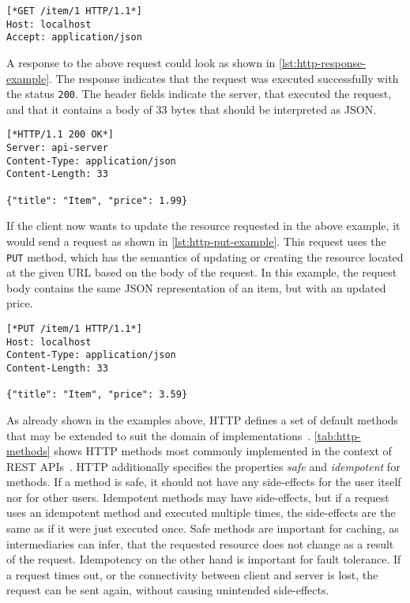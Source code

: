 \begin{lstlisting}[caption={\acs{HTTP} GET request}, showlines=true, label=lst:http-get-example, language=http]
[*GET /item/1 HTTP/1.1*]
Host: localhost
Accept: application/json

\end{lstlisting}

A response to the above request could look as shown in \autoref{lst:http-response-example}.
The response indicates that the request was executed successfully with the status \texttt{200}.
The header fields indicate the server, that executed the request, and that it contains a body of 33 bytes that should be interpreted as \ac{JSON}.

\begin{lstlisting}[caption={\acs{HTTP} response to GET request}, label=lst:http-response-example, language=http]
[*HTTP/1.1 200 OK*]
Server: api-server
Content-Type: application/json
Content-Length: 33

{"title": "Item", "price": 1.99}
\end{lstlisting}

If the client now wants to update the resource requested in the above example, it would send a request as shown in \autoref{lst:http-put-example}.
This request uses the \texttt{PUT} method, which has the semantics of updating or creating the resource located at the given \ac{URL} based on the body of the request.
In this example, the request body contains the same \ac{JSON} representation of an item, but with an updated price.

\begin{lstlisting}[caption={\acs{HTTP} PUT request}, label=lst:http-put-example, language=http]
[*PUT /item/1 HTTP/1.1*]
Host: localhost
Content-Type: application/json
Content-Length: 33

{"title": "Item", "price": 3.59}
\end{lstlisting}

As already shown in the examples above, \ac{HTTP} defines a set of default methods that may be extended to suit the domain of implementations~\cite{RFC2068}.
\autoref{tab:http-methods} shows \ac{HTTP} methods most commonly implemented in the context of \ac{REST} \acp{API}~\cite{Buelthoff2019}.
\ac{HTTP} additionally specifies the properties \textit{safe} and \textit{idempotent} for methods.
If a method is safe, it should not have any side-effects for the user itself nor for other users.
Idempotent methods may have side-effects, but if a request uses an idempotent method and executed multiple times, the side-effects are the same as if it were just executed once.
Safe methods are important for caching, as intermediaries can infer, that the requested resource does not change as a result of the request.
Idempotency on the other hand is important for fault tolerance.
If a request times out, or the connectivity between client and server is lost, the request can be sent again, without causing unintended side-effects.


